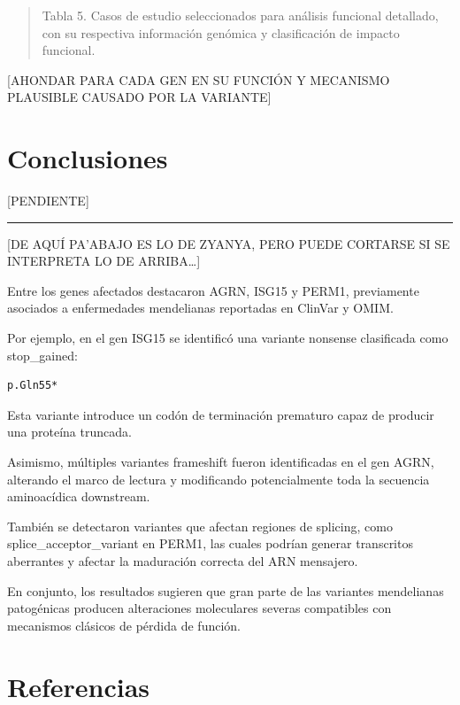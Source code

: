 \documentclass[
  spanish,
  11pt,
]{article}
\begin{document}
\begin{quote}
Tabla 5. Casos de estudio seleccionados para análisis funcional
detallado, con su respectiva información genómica y clasificación de
impacto funcional.
\end{quote}

{[}AHONDAR PARA CADA GEN EN SU FUNCIÓN Y MECANISMO PLAUSIBLE CAUSADO POR
LA VARIANTE{]}

\section{Conclusiones}\label{conclusiones}

{[}PENDIENTE{]}

\begin{center}\rule{0.5\linewidth}{0.5pt}\end{center}

{[}DE AQUÍ PA'ABAJO ES LO DE ZYANYA, PERO PUEDE CORTARSE SI SE
INTERPRETA LO DE ARRIBA\ldots{]}

Entre los genes afectados destacaron AGRN, ISG15 y PERM1, previamente
asociados a enfermedades mendelianas reportadas en ClinVar y OMIM.

Por ejemplo, en el gen ISG15 se identificó una variante nonsense
clasificada como stop\_gained:

\begin{verbatim}
p.Gln55*
\end{verbatim}

Esta variante introduce un codón de terminación prematuro capaz de
producir una proteína truncada.

Asimismo, múltiples variantes frameshift fueron identificadas en el gen
AGRN, alterando el marco de lectura y modificando potencialmente toda la
secuencia aminoacídica downstream.

También se detectaron variantes que afectan regiones de splicing, como
splice\_acceptor\_variant en PERM1, las cuales podrían generar
transcritos aberrantes y afectar la maduración correcta del ARN
mensajero.

En conjunto, los resultados sugieren que gran parte de las variantes
mendelianas patogénicas producen alteraciones moleculares severas
compatibles con mecanismos clásicos de pérdida de función.

\section*{Referencias}\label{referencias}
\end{document}
